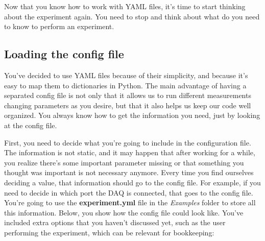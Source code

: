 



Now that you know how to work with YAML files, it's time to start thinking about the experiment again. You need to stop and think about what do you need to know to perform an experiment.


\subsection{Loading the config file}\label{subsec:loading-the-config}
You've decided to use YAML files because of their simplicity, and because it's easy to map them to dictionaries in Python. The main advantage of having a separated config file is not only that it allows us to run different measurements changing parameters as you desire, but that it also helps us keep our code well organized. You always know how to get the information you need, just by looking at the config file.

First, you need to decide what you're going to include in the configuration file. The information is not static, and it may happen that after working for a while, you realize there's some important parameter missing or that something you thought was important is not necessary anymore. Every time you find ourselves deciding a value, that information should go to the config file. For example, if you need to decide in which port the DAQ is connected, that goes to the config file. You're going to use the \textbf{experiment.yml} file in the \emph{Examples} folder to store all this information. Below, you show how the config file could look like. You've included extra options that you haven't discussed yet, such as the user performing the experiment, which can be relevant for bookkeeping:

